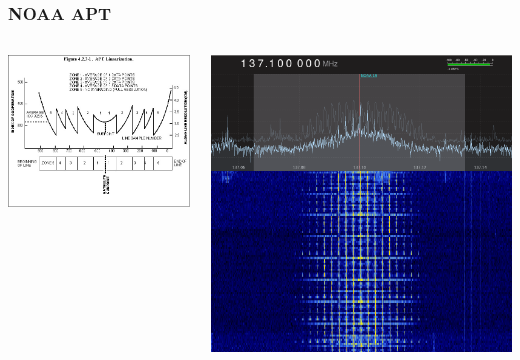\documentclass[]{beamer}
\begin{document}
\begin{frame}
    \frametitle{NOAA APT}
    \begin{columns}[T]
        \begin{column}[T]{5cm}
            \includegraphics[width=0.45\paperwidth]{images/apt-freq.jpg}
        \end{column}
        \begin{column}[T]{5cm}
            \includegraphics[height=0.45\paperwidth]{images/apt-gqrx.png}
        \end{column}
    \end{columns}
    \begin{center}
    \end{center}
\end{frame}
\end{document}
